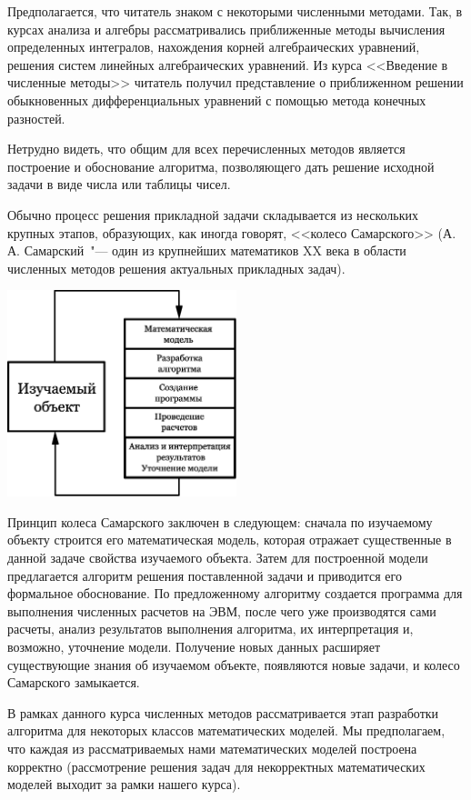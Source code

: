 \documentclass[11pt,a4paper,twoside,listtotoc,bibtotoc]{report}
\numberwithin{equation}{section}
\theoremstyle{definition}
\theoremstyle{plain}
\begin{document}
Предполагается, что читатель знаком с некоторыми численными методами. Так, в курсах
анализа и алгебры рассматривались приближенные методы вычисления определенных
интегралов, нахождения корней алгебраических уравнений, решения систем линейных
алгебраических уравнений. Из курса <<Введение в численные методы>> читатель
получил представление о приближенном решении обыкновенных дифференциальных уравнений
с помощью метода конечных разностей.

Нетрудно видеть, что общим для всех перечисленных методов является построение и
обоснование алгоритма, позволяющего дать решение исходной задачи в виде числа или
таблицы чисел.

Обычно процесс решения прикладной задачи складывается из нескольких крупных этапов,
образующих, как иногда говорят, <<колесо Самарского>> (А.\,А. Самарский~"--- один из
крупнейших математиков XX века в области численных методов решения актуальных
прикладных задач).
%
\begin{center}
    \includegraphics[width=0.5\textwidth]{circle.eps}\\
\end{center}
%

Принцип колеса Самарского заключен в следующем: сначала по изучаемому
объекту строится его математическая модель, которая отражает существенные в
данной задаче свойства изучаемого объекта. Затем для построенной модели
предлагается алгоритм решения поставленной задачи и приводится его формальное
обоснование. По предложенному алгоритму создается программа для выполнения
численных расчетов на ЭВМ, после чего уже производятся сами расчеты, анализ
результатов выполнения алгоритма, их интерпретация и, возможно, уточнение
модели. Получение новых данных расширяет существующие знания об изучаемом
объекте, появляются новые задачи, и колесо Самарского замыкается.

В рамках данного курса численных методов рассматривается этап разработки
алгоритма для некоторых классов математических моделей. Мы предполагаем, что
каждая из рассматриваемых нами математических моделей построена корректно
(рассмотрение решения задач для некорректных математических моделей выходит
за рамки нашего курса).
\end{document}
